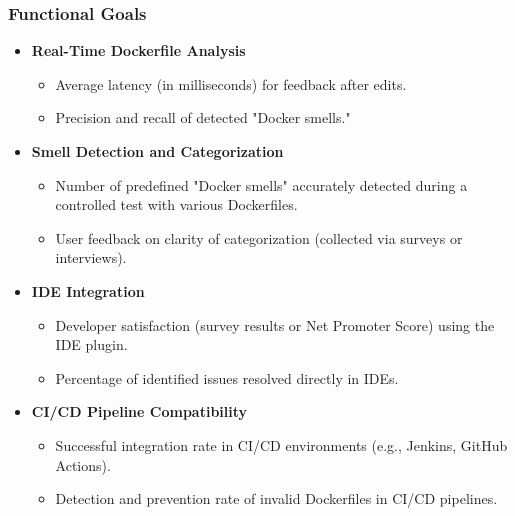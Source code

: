\subsubsection*{Functional Goals}
\begin{itemize}
    \item \textbf{Real-Time Dockerfile Analysis}
    \begin{itemize}
        \item Average latency (in milliseconds) for feedback after edits.
        \item Precision and recall of detected "Docker smells."
    \end{itemize}

    \item \textbf{Smell Detection and Categorization}
    \begin{itemize}
        \item Number of predefined "Docker smells" accurately detected during a controlled test with various Dockerfiles.
        \item User feedback on clarity of categorization (collected via surveys or interviews).
    \end{itemize}

    \item \textbf{IDE Integration}
    \begin{itemize}
        \item Developer satisfaction (survey results or Net Promoter Score) using the IDE plugin.
        \item Percentage of identified issues resolved directly in IDEs.
    \end{itemize}

    \item \textbf{CI/CD Pipeline Compatibility}
    \begin{itemize}
        \item Successful integration rate in CI/CD environments (e.g., Jenkins, GitHub Actions).
        \item Detection and prevention rate of invalid Dockerfiles in CI/CD pipelines.
    \end{itemize}
\end{itemize}


